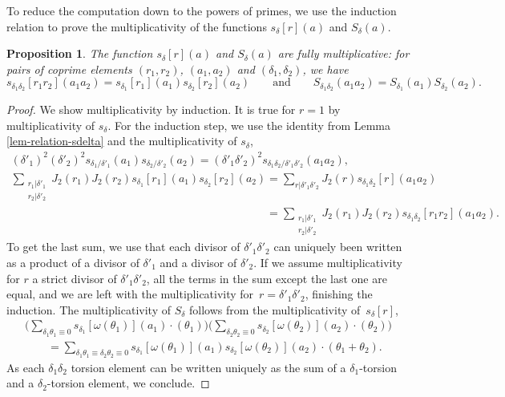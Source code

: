 \documentclass[pdftex]{sigma}
\numberwithin{equation}{section}
\newtheorem{prop}[theo]{Proposition}
\theoremstyle{definition}
\begin{document}
To reduce the computation down to the powers of primes, we use the induction relation to prove the multiplicativity of the functions $s_\delta[r](a)$ and $S_\delta(a)$.

\begin{prop}\label{prop-multiplicativity-S}
The function $s_\delta[r](a)$ and $S_\delta(a)$ are fully multiplicative: for pairs of coprime elements $(r_1,r_2)$, $(a_1,a_2)$ and $(\delta_1,\delta_2)$, we have
\[ s_{\delta_1\delta_2}[r_1r_2](a_1a_2) = s_{\delta_1}[r_1](a_1)s_{\delta_2}[r_2](a_2)\qquad
\text{and}\qquad
S_{\delta_1\delta_2}(a_1a_2)=S_{\delta_1}(a_1)S_{\delta_2}(a_2). \]
\end{prop}

\begin{proof}
We show multiplicativity by induction. It is true for $r=1$ by multiplicativity of $s_\delta$. For the induction step, we use the identity from Lemma \ref{lem-relation-sdelta} and the multiplicativity of $s_\delta$,
\begin{gather*}
(\delta'_1)^2(\delta'_2)^2 s_{\delta_1/\delta'_1}(a_1)s_{\delta_2/\delta'_2}(a_2) = (\delta'_1\delta'_2)^2 s_{\delta_1\delta_2/\delta'_1\delta'_2}(a_1a_2), \\
\sum_{\substack{r_1|\delta'_1 \\ r_2|\delta'_2}} J_2(r_1)J_2(r_2)s_{\delta_1}[r_1](a_1)s_{\delta_2}[r_2](a_2) = \sum_{r|\delta'_1\delta'_2} J_2(r)s_{\delta_1\delta_2}[r](a_1a_2) \\
 \phantom{\sum_{\substack{r_1|\delta'_1 \\ r_2|\delta'_2}} J_2(r_1)J_2(r_2)s_{\delta_1}[r_1](a_1)s_{\delta_2}[r_2](a_2) }{}=\sum_{\substack{r_1|\delta'_1 \\ r_2|\delta'_2}} J_2(r_1)J_2(r_2)s_{\delta_1\delta_2}[r_1r_2](a_1a_2).
\end{gather*}
To get the last sum, we use that each divisor of $\delta'_1\delta'_2$ can uniquely been written as a product of a divisor of $\delta'_1$ and a divisor of $\delta'_2$. If we assume multiplicativity for $r$ a strict divisor of $\delta'_1\delta'_2$, all the terms in the sum except the last one are equal, and we are left with the multiplicativity for~${r=\delta'_1\delta'_2}$, finishing the induction. The multiplicativity of $S_\delta$ follows from the multiplicativity of~$s_\delta[r]$,
\begin{gather*}
\biggl(\sum_{\delta_1\theta_1\equiv 0}s_{\delta_1}[\omega(\theta_1)](a_1)\cdot(\theta_1) \biggr)\biggl(\sum_{\delta_2\theta_2\equiv 0}s_{\delta_2}[\omega(\theta_2)](a_2)\cdot(\theta_2) \biggr) \\
\qquad= \sum_{\delta_1\theta_1\equiv\delta_2\theta_2\equiv 0}s_{\delta_1}[\omega(\theta_1)](a_1)s_{\delta_2}[\omega(\theta_2)](a_2)\cdot(\theta_1+\theta_2).
\end{gather*}
As each $\delta_1\delta_2$ torsion element can be written uniquely as the sum of a $\delta_1$-torsion and a $\delta_2$-torsion element, we conclude.
\end{proof}
\end{document}
